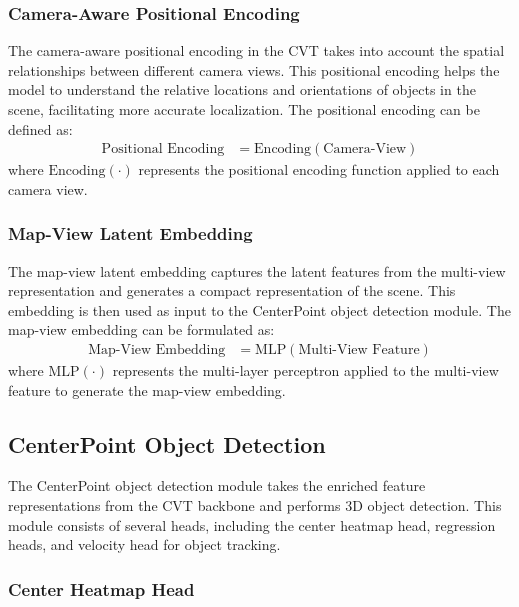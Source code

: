 \documentclass[times, report, parskip, openbib, twocolumn]{article}
\begin{document}
\subsubsection{Camera-Aware Positional Encoding}
\label{subsubsec:camera_aware_positional_encoding}

The camera-aware positional encoding in the CVT takes into account the spatial relationships between different camera views. This positional encoding helps the model to understand the relative locations and orientations of objects in the scene, facilitating more accurate localization. The positional encoding can be defined as:
\begin{align}
    \text{Positional Encoding} &= \text{Encoding}(\text{Camera-View})
\end{align}
where $\text{Encoding}(\cdot)$ represents the positional encoding function applied to each camera view.

\subsubsection{Map-View Latent Embedding}
\label{subsubsec:map_view_latent_embedding}

The map-view latent embedding captures the latent features from the multi-view representation and generates a compact representation of the scene. This embedding is then used as input to the CenterPoint object detection module. The map-view embedding can be formulated as:
\begin{align}
    \text{Map-View Embedding} &= \text{MLP}(\text{Multi-View Feature})
\end{align}
where $\text{MLP}(\cdot)$ represents the multi-layer perceptron applied to the multi-view feature to generate the map-view embedding.

\subsection{CenterPoint Object Detection}
\label{subsec:centerpoint_object_detection}

The CenterPoint object detection module takes the enriched feature representations from the CVT backbone and performs 3D object detection. This module consists of several heads, including the center heatmap head, regression heads, and velocity head for object tracking.

\subsubsection{Center Heatmap Head}
\label{subsubsec:center_heatmap_head}
\end{document}
